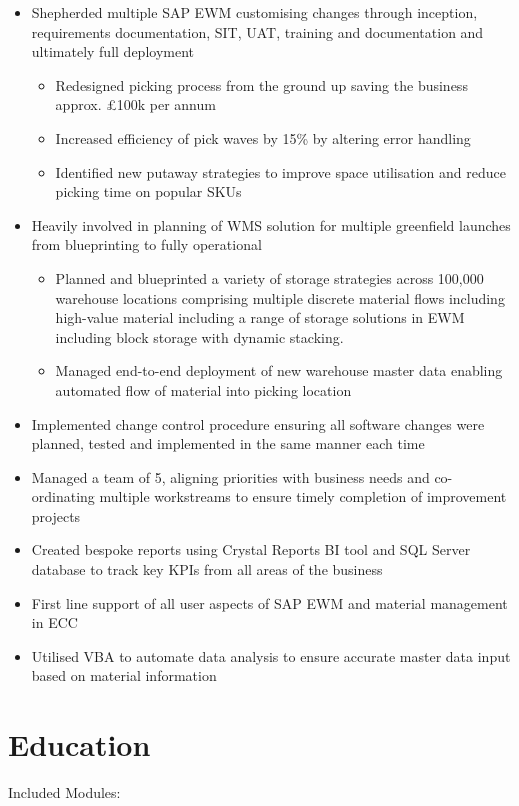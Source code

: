 \documentclass[11pt,a4paper]{moderncv}
\begin{document}
\begin{itemize}
\item Shepherded multiple SAP EWM customising changes through inception, requirements documentation, SIT, UAT, training and documentation and ultimately full deployment
\begin{itemize}
    \item Redesigned picking process from the ground up saving the business approx. £100k per annum
    \item Increased efficiency of pick waves by 15\% by altering error handling
    \item Identified new putaway strategies to improve space utilisation and reduce picking time on popular SKUs
\end{itemize}
\item Heavily involved in planning of WMS solution for multiple greenfield launches from blueprinting to fully operational
\begin{itemize}
    \item Planned and blueprinted a variety of storage strategies across 100,000 warehouse locations comprising multiple discrete material flows including high-value material including a range of storage solutions in EWM including block storage with dynamic stacking.
    \item Managed end-to-end deployment of new warehouse master data enabling automated flow of material into picking location
\end{itemize} 
\item Implemented change control procedure ensuring all software changes were planned, tested and implemented in the same manner each time
\item Managed a team of 5, aligning priorities with business needs and co-ordinating multiple workstreams to ensure timely completion of improvement projects
\item Created bespoke reports using Crystal Reports BI tool and SQL Server database to track key KPIs from all areas of the business
\item First line support of all user aspects of SAP EWM and material management in ECC
\item Utilised VBA to automate data analysis to ensure accurate master data input based on material information
\end{itemize}
\pagebreak
\section{Education}
Included Modules:%
\end{document}
